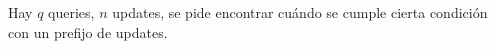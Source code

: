 
Hay $q$ queries, $n$ updates, se pide encontrar cuándo se cumple cierta condición con un prefijo de updates.
